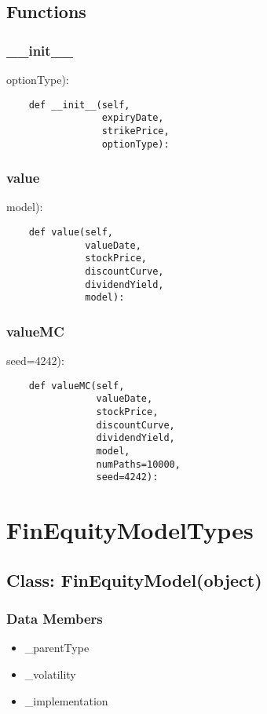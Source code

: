 \documentclass[twoside,11pt]{book}
\begin{document}
\subsection*{Functions}

\subsubsection*{{\bf \_\_init\_\_}}
optionType): 

\begin{lstlisting}
    def __init__(self,
                 expiryDate,
                 strikePrice,
                 optionType):
\end{lstlisting}

\subsubsection*{{\bf value}}
model): 

\begin{lstlisting}
    def value(self,
              valueDate,
              stockPrice,
              discountCurve,
              dividendYield,
              model):
\end{lstlisting}

\subsubsection*{{\bf valueMC}}
seed=4242): 

\begin{lstlisting}
    def valueMC(self,
                valueDate,
                stockPrice,
                discountCurve,
                dividendYield,
                model,
                numPaths=10000,
                seed=4242):
\end{lstlisting}

\newpage
\section{FinEquityModelTypes}

\subsection*{Class: FinEquityModel(object)}


\subsubsection*{Data Members}
\begin{itemize}
\item{\_parentType}
\item{\_volatility}
\item{\_implementation}
\end{itemize}
\end{document}
